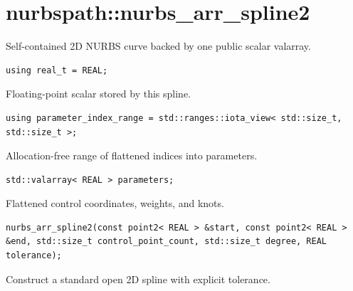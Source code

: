 \section{nurbspath::nurbs\_arr\_spline2}
Self-contained 2D NURBS curve backed by one public scalar valarray.
\par\noindent\begin{minipage}{\linewidth}
\begin{lstlisting}[style=apireference]
using real_t = REAL;
\end{lstlisting}
{\footnotesize Floating-point scalar stored by this spline.\par}
\end{minipage}\par\vspace{1pt}
\par\noindent\begin{minipage}{\linewidth}
\begin{lstlisting}[style=apireference]
using parameter_index_range = std::ranges::iota_view< std::size_t, std::size_t >;
\end{lstlisting}
{\footnotesize Allocation-free range of flattened indices into parameters.\par}
\end{minipage}\par\vspace{1pt}
\par\noindent\begin{minipage}{\linewidth}
\begin{lstlisting}[style=apireference]
std::valarray< REAL > parameters;
\end{lstlisting}
{\footnotesize Flattened control coordinates, weights, and knots.\par}
\end{minipage}\par\vspace{1pt}
\par\noindent\begin{minipage}{\linewidth}
\begin{lstlisting}[style=apireference]
nurbs_arr_spline2(const point2< REAL > &start, const point2< REAL > &end, std::size_t control_point_count, std::size_t degree, REAL tolerance);
\end{lstlisting}
{\footnotesize Construct a standard open 2D spline with explicit tolerance.\par}
\end{minipage}\par\vspace{1pt}
